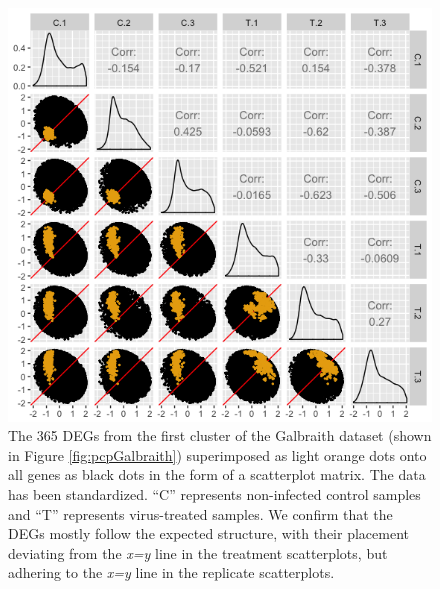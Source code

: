 \documentclass[11pt,a4paper,oldfontcommands,openany]{memoir}
\numberwithin{equation}{section} %
\begin{document}
\begin{figure}[H]
\begin{framed}
  \includegraphics[width=\textwidth]{Images/GalbraithClust1SM}
\end{framed}
  \caption{The 365 DEGs from the first cluster of the Galbraith dataset (shown in Figure \ref{fig:pcpGalbraith}) superimposed as light orange dots onto all genes as black dots in the form of a scatterplot matrix. The data has been standardized. ``C'' represents non-infected control samples and ``T'' represents virus-treated samples. We confirm that the DEGs mostly follow the expected structure, with their placement deviating from the \textit{x=y} line in the treatment scatterplots, but adhering to the \textit{x=y} line in the replicate scatterplots.}
  \label{fig:GalbraithClust1SM}
\end{figure}
\end{document}
